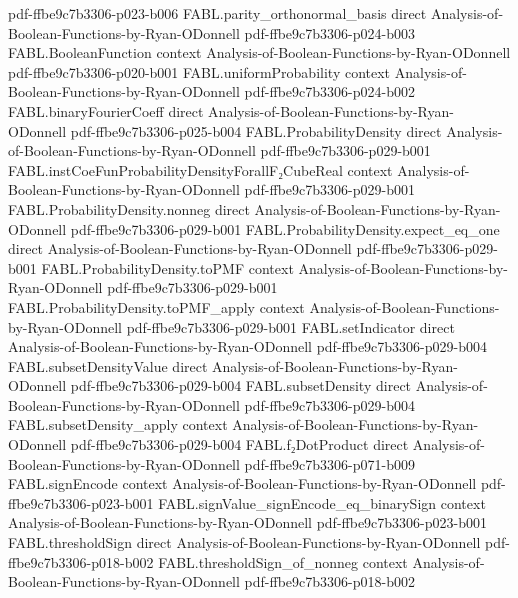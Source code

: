 \begin{theorem}
  {pdf-ffbe9c7b3306-p023-b006}
\proofstep
  {FABL.parity_orthonormal_basis}
  {direct}
  {Analysis-of-Boolean-Functions-by-Ryan-ODonnell}
  {pdf-ffbe9c7b3306-p024-b003}
\proofstep
  {FABL.BooleanFunction}
  {context}
  {Analysis-of-Boolean-Functions-by-Ryan-ODonnell}
  {pdf-ffbe9c7b3306-p020-b001}
\proofstep
  {FABL.uniformProbability}
  {context}
  {Analysis-of-Boolean-Functions-by-Ryan-ODonnell}
  {pdf-ffbe9c7b3306-p024-b002}
\proofstep
  {FABL.binaryFourierCoeff}
  {direct}
  {Analysis-of-Boolean-Functions-by-Ryan-ODonnell}
  {pdf-ffbe9c7b3306-p025-b004}
\proofstep
  {FABL.ProbabilityDensity}
  {direct}
  {Analysis-of-Boolean-Functions-by-Ryan-ODonnell}
  {pdf-ffbe9c7b3306-p029-b001}
\proofstep
  {FABL.instCoeFunProbabilityDensityForallF₂CubeReal}
  {context}
  {Analysis-of-Boolean-Functions-by-Ryan-ODonnell}
  {pdf-ffbe9c7b3306-p029-b001}
\proofstep
  {FABL.ProbabilityDensity.nonneg}
  {direct}
  {Analysis-of-Boolean-Functions-by-Ryan-ODonnell}
  {pdf-ffbe9c7b3306-p029-b001}
\proofstep
  {FABL.ProbabilityDensity.expect_eq_one}
  {direct}
  {Analysis-of-Boolean-Functions-by-Ryan-ODonnell}
  {pdf-ffbe9c7b3306-p029-b001}
\proofstep
  {FABL.ProbabilityDensity.toPMF}
  {context}
  {Analysis-of-Boolean-Functions-by-Ryan-ODonnell}
  {pdf-ffbe9c7b3306-p029-b001}
\proofstep
  {FABL.ProbabilityDensity.toPMF_apply}
  {context}
  {Analysis-of-Boolean-Functions-by-Ryan-ODonnell}
  {pdf-ffbe9c7b3306-p029-b001}
\proofstep
  {FABL.setIndicator}
  {direct}
  {Analysis-of-Boolean-Functions-by-Ryan-ODonnell}
  {pdf-ffbe9c7b3306-p029-b004}
\proofstep
  {FABL.subsetDensityValue}
  {direct}
  {Analysis-of-Boolean-Functions-by-Ryan-ODonnell}
  {pdf-ffbe9c7b3306-p029-b004}
\proofstep
  {FABL.subsetDensity}
  {direct}
  {Analysis-of-Boolean-Functions-by-Ryan-ODonnell}
  {pdf-ffbe9c7b3306-p029-b004}
\proofstep
  {FABL.subsetDensity_apply}
  {context}
  {Analysis-of-Boolean-Functions-by-Ryan-ODonnell}
  {pdf-ffbe9c7b3306-p029-b004}
\proofstep
  {FABL.f₂DotProduct}
  {direct}
  {Analysis-of-Boolean-Functions-by-Ryan-ODonnell}
  {pdf-ffbe9c7b3306-p071-b009}
\proofstep
  {FABL.signEncode}
  {context}
  {Analysis-of-Boolean-Functions-by-Ryan-ODonnell}
  {pdf-ffbe9c7b3306-p023-b001}
\proofstep
  {FABL.signValue_signEncode_eq_binarySign}
  {context}
  {Analysis-of-Boolean-Functions-by-Ryan-ODonnell}
  {pdf-ffbe9c7b3306-p023-b001}
\proofstep
  {FABL.thresholdSign}
  {direct}
  {Analysis-of-Boolean-Functions-by-Ryan-ODonnell}
  {pdf-ffbe9c7b3306-p018-b002}
\proofstep
  {FABL.thresholdSign_of_nonneg}
  {context}
  {Analysis-of-Boolean-Functions-by-Ryan-ODonnell}
  {pdf-ffbe9c7b3306-p018-b002}

\end{theorem}
